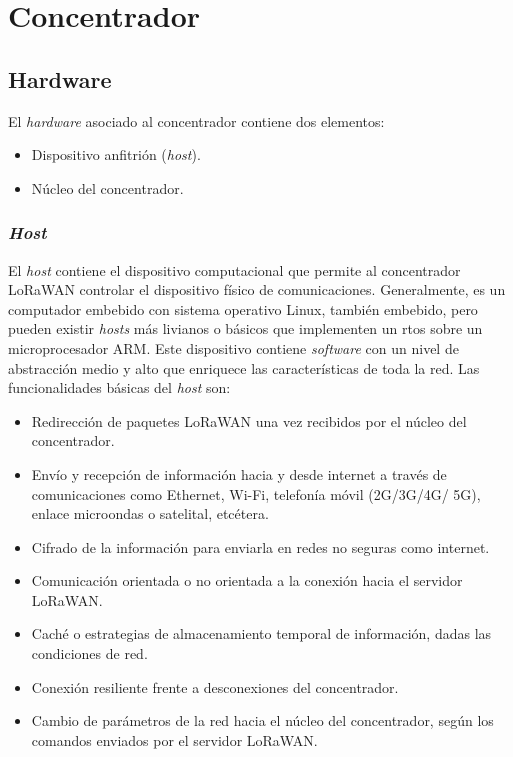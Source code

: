 \chapter{Concentrador}

\section{Hardware}
El \emph{hardware} asociado al concentrador contiene dos elementos:

\begin{itemize}
  \item Dispositivo anfitrión (\emph{host}).
  \item Núcleo del concentrador.
\end{itemize}

\subsection{\emph{Host}}
El \emph{host} contiene el dispositivo computacional que permite al concentrador LoRaWAN controlar el dispositivo físico de comunicaciones. Generalmente, es un computador embebido con sistema operativo Linux, también embebido, pero pueden existir \emph{hosts} más livianos o básicos que implementen un \gls{rtos} sobre un microprocesador ARM. Este dispositivo contiene \emph{software} con un nivel de abstracción medio y alto que enriquece las características de toda la red. Las funcionalidades básicas del \emph{host} son:

\begin{itemize}
  \item Redirección de paquetes LoRaWAN una vez recibidos por el núcleo del concentrador.
  \item Envío y recepción de información hacia y desde internet a través de comunicaciones como Ethernet, Wi-Fi, telefonía móvil (2G/3G/4G/ 5G), enlace microondas o satelital, etcétera.
  \item Cifrado de la información para enviarla en redes no seguras como internet.
  \item Comunicación orientada o no orientada a la conexión hacia el servidor LoRaWAN.
  \item Caché o estrategias de almacenamiento temporal de información, dadas las condiciones de red.
  \item Conexión resiliente frente a desconexiones del concentrador.
  \item Cambio de parámetros de la red hacia el núcleo del concentrador, según los comandos enviados por el servidor LoRaWAN.
\end{itemize}

